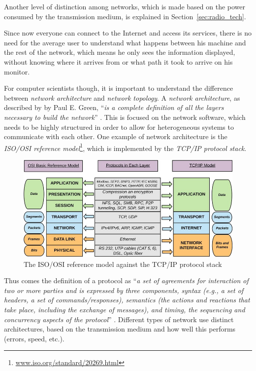 		Another level of distinction among networks, which is made based on the power consumed by the transmission medium, is explained in Section~\ref{sec:radio_tech}.
		
		Since now everyone can connect to the Internet and access its services, there is no need for the average user to understand what happens between his machine and the rest of the network, which means he only sees the information displayed, without knowing where it arrives from or what path it took to arrive on his monitor.
		
		For computer scientists though, it is important to understand the difference between \textit{network architecture} and \textit{network topology}.	
		A \textit{network architecture}, as described by by Paul E. Green, ``\textit{is a complete definition of all the layers necessary to build the network}'' \cite{nla.cat-vn252493}.
		This is focused on the network software, which needs to be highly structured in order to allow for heterogeneous systems to communicate with each other.
		One example of network architecture is the \textit{ISO/OSI reference model}\footnote{ \url{www.iso.org/standard/20269.html}}, which is implemented by the \textit{TCP/IP protocol stack}.
		
		\begin{figure}[h]
			\centering
			\includegraphics[width=\textwidth]{resources/img/chap3/isoosi}
			\caption{The ISO/OSI reference model against the TCP/IP protocol stack}
		\end{figure}
		
		Thus comes the definition of a protocol as ``\textit{a set of agreements for interaction of two or more parties and is expressed by three components, syntax (e.g., a set of headers, a set of commands/responses), semantics (the actions and reactions that take place, including the exchange of messages), and timing, the sequencing and concurrency aspects of the protocol}'' \cite{nla.cat-vn252493}.
		Different types of network use distinct architectures, based on the transmission medium and how well this performs (errors, speed, etc.).
		
